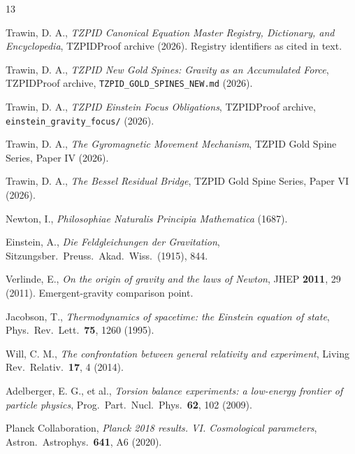 \documentclass[11pt]{article}
\theoremstyle{remark}
\begin{document}
\begin{thebibliography}{13}

 Trawin, D. A., \emph{TZPID Canonical Equation Master Registry, Dictionary, and Encyclopedia}, TZPIDProof archive (2026). Registry identifiers as cited in text.

 Trawin, D. A., \emph{TZPID New Gold Spines: Gravity as an Accumulated Force}, TZPIDProof archive, \texttt{TZPID\_GOLD\_SPINES\_NEW.md} (2026).

 Trawin, D. A., \emph{TZPID Einstein Focus Obligations}, TZPIDProof archive, \texttt{einstein\_gravity\_focus/} (2026).

 Trawin, D. A., \emph{The Gyromagnetic Movement Mechanism}, TZPID Gold Spine Series, Paper IV (2026).

 Trawin, D. A., \emph{The Bessel Residual Bridge}, TZPID Gold Spine Series, Paper VI (2026).

 Newton, I., \emph{Philosophiae Naturalis Principia Mathematica} (1687).

 Einstein, A., \emph{Die Feldgleichungen der Gravitation}, Sitzungsber.\ Preuss.\ Akad.\ Wiss.\ (1915), 844.

 Verlinde, E., \emph{On the origin of gravity and the laws of Newton}, JHEP \textbf{2011}, 29 (2011). Emergent-gravity comparison point.

 Jacobson, T., \emph{Thermodynamics of spacetime: the Einstein equation of state}, Phys.\ Rev.\ Lett.\ \textbf{75}, 1260 (1995).

 Will, C. M., \emph{The confrontation between general relativity and experiment}, Living Rev.\ Relativ.\ \textbf{17}, 4 (2014).

 Adelberger, E. G., et al., \emph{Torsion balance experiments: a low-energy frontier of particle physics}, Prog.\ Part.\ Nucl.\ Phys.\ \textbf{62}, 102 (2009).

 Planck Collaboration, \emph{Planck 2018 results. VI. Cosmological parameters}, Astron.\ Astrophys.\ \textbf{641}, A6 (2020).

\end{thebibliography}
\end{document}
